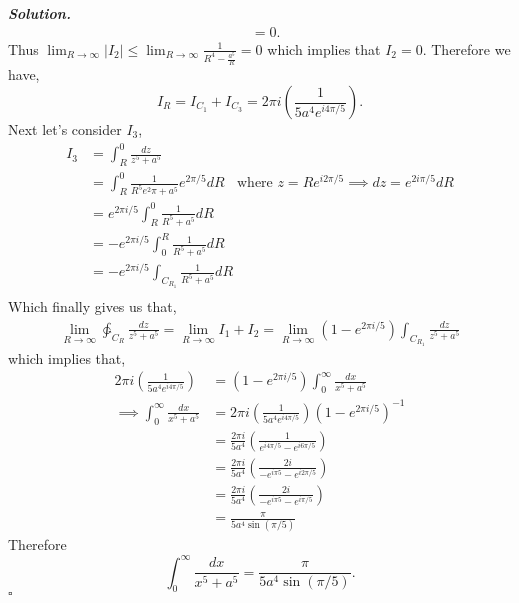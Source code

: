 \documentclass[12pt]{report}
\newenvironment{solution}[1][\it{Solution}]{\textbf{#1. } }{$\square$}
\def\ointcc{{\ointctrclockwise}}
\begin{document}
\begin{solution}
\begin{align*}
        &= 0.
    \end{align*}
    Thus $\lim_{R \rightarrow \infty} |I_2| \leq \lim_{R \rightarrow \infty} \frac{1}{R^4 - \frac{a^5}{R}} = 0$ which implies that $I_2 = 0$. Therefore we have,
    \[I_R = I_{C_1} + I_{C_3} = 2\pi i \left( \frac{1}{5a^4e^{i4\pi/5}} \right).\]
    Next let's consider $I_3$,
    \begin{align*}
        I_{3} &= \int_R^0 \frac{dz}{z^5 + a^5}\\
        &= \int_R^0 \frac{1}{R^5e^2\pi + a^5}e^{2\pi/5}dR ~~~~ \text{where } z = Re^{i2\pi/5} \implies dz = e^{2i\pi/5}dR\\
        &= e^{2\pi i/5} \int_R^0 \frac{1}{R^5 + a^5}dR\\
        &= -e^{2\pi i/5} \int_0^R \frac{1}{R^5 + a^5}dR\\
        &= -e^{2\pi i/5} \int_{C_{R_1}} \frac{1}{R^5 + a^5}dR\\
    \end{align*}
    Which finally gives us that,
    \begin{align*}
        \lim_{R \rightarrow \infty} \ointcc_{C_R} \frac{dz}{z^5 + a^5} = \lim_{R \rightarrow \infty} I_1 + I_2 = \lim_{R \rightarrow \infty} (1 - e^{2\pi i/5}) \int_{C_{R_1}} \frac{dz}{z^5 + a^5}
    \end{align*}
    which implies that,
    \begin{align*}
        2\pi i (\frac{1}{5a^4e^{i4\pi/5}}) &= (1 - e^{2\pi i/5})\int_0^\infty \frac{dx}{x^5 + a^5}\\
        \implies \int_0^\infty \frac{dx}{x^5 + a^5} &= 2\pi i (\frac{1}{5a^4e^{i4\pi/5}})(1 - e^{2\pi i/5})^{-1}\\
        &= \frac{2\pi i}{5a^4} \left( \frac{1}{e^{i4\pi/5} - e^{i6\pi/5}}\right)\\
        &= \frac{2\pi i}{5a^4} \left( \frac{2i}{-e^{i\pi 5} - e^{i2\pi/5}}\right)\\
        &= \frac{2\pi i}{5a^4} \left( \frac{2i}{-e^{i\pi 5} - e^{i\pi/5}}\right)\\
        &= \frac{\pi}{5a^4\sin(\pi/5)}
    \end{align*}
    Therefore \[\int_0^\infty \frac{dx}{x^5 + a^5} = \frac{\pi}{5a^4\sin(\pi/5)}.\]
\end{solution}

\end{document}
